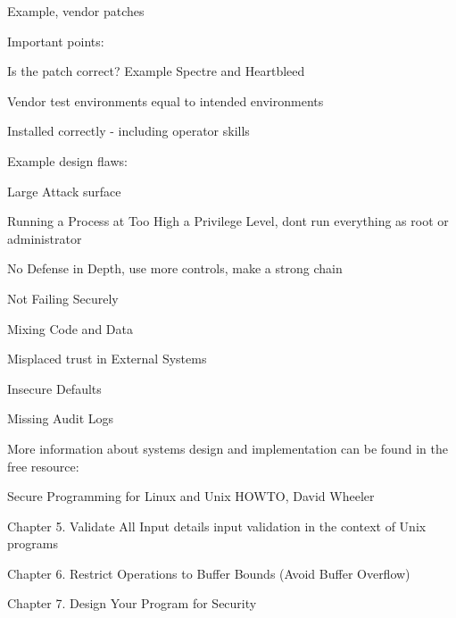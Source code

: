 \documentclass[Screen16to9,17pt]{foils}
\begin{document}
\begin{list1}
\item Example, vendor patches
\item Important points:
\begin{list2}
\item Is the patch correct? Example Spectre and Heartbleed
\item Vendor test environments equal to intended environments
\item Installed correctly - including operator skills
\end{list2}
\end{list1}



Example design flaws:
\begin{list2}
\item Large Attack surface
\item Running a Process at Too High a Privilege Level, dont run everything as root or administrator
\item No Defense in Depth, use more controls, make a strong chain
\item Not Failing Securely
\item Mixing Code and Data
\item Misplaced trust in External Systems
\item Insecure Defaults
\item Missing Audit Logs
\end{list2}


\begin{list1}
\item More information about systems design and implementation can be found in the free resource:
\item Secure Programming for Linux and Unix HOWTO, David Wheeler
\item {}
\item Chapter 5. Validate All Input details input validation in the context of Unix programs
\item Chapter 6. Restrict Operations to Buffer Bounds (Avoid Buffer Overflow)
\item Chapter 7. Design Your Program for Security
\end{list1}

\end{document}
